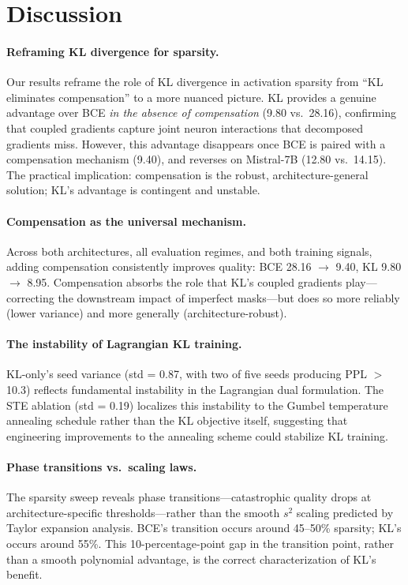 \documentclass[11pt]{article}
\begin{document}
\section{Discussion}

\paragraph{Reframing KL divergence for sparsity.}
Our results reframe the role of KL divergence in activation sparsity from ``KL eliminates compensation'' to a more nuanced picture.
KL provides a genuine advantage over BCE \emph{in the absence of compensation} (9.80 vs.\ 28.16), confirming that coupled gradients capture joint neuron interactions that decomposed gradients miss.
However, this advantage disappears once BCE is paired with a compensation mechanism (9.40), and reverses on Mistral-7B (12.80 vs.\ 14.15).
The practical implication: compensation is the robust, architecture-general solution; KL's advantage is contingent and unstable.

\paragraph{Compensation as the universal mechanism.}
Across both architectures, all evaluation regimes, and both training signals, adding compensation consistently improves quality: BCE 28.16 $\to$ 9.40, KL 9.80 $\to$ 8.95.
Compensation absorbs the role that KL's coupled gradients play---correcting the downstream impact of imperfect masks---but does so more reliably (lower variance) and more generally (architecture-robust).

\paragraph{The instability of Lagrangian KL training.}
KL-only's seed variance (std = 0.87, with two of five seeds producing PPL $>$ 10.3) reflects fundamental instability in the Lagrangian dual formulation.
The STE ablation (std = 0.19) localizes this instability to the Gumbel temperature annealing schedule rather than the KL objective itself, suggesting that engineering improvements to the annealing scheme could stabilize KL training.

\paragraph{Phase transitions vs.\ scaling laws.}
The sparsity sweep reveals phase transitions---catastrophic quality drops at architecture-specific thresholds---rather than the smooth $s^2$ scaling predicted by Taylor expansion analysis.
BCE's transition occurs around 45--50\% sparsity; KL's occurs around 55\%.
This 10-percentage-point gap in the transition point, rather than a smooth polynomial advantage, is the correct characterization of KL's benefit.
\end{document}
